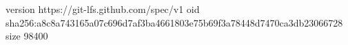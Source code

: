 version https://git-lfs.github.com/spec/v1
oid sha256:a8c8a743165a07c696d7af3ba4661803e75b69f3a78448d7470ca3db23066728
size 98400
